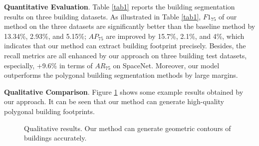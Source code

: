 \documentclass{article}
\begin{document}
\noindent \textbf{Quantitative Evaluation}.
Table \ref{tab1} reports the building segmentation results on three building datasets. As illustrated in Table \ref{tab1}, $F1_{75}$ of our method on the three datasets are significantly better than the baseline method by 13.34\%, 2.93\%, and 5.15\%; $AP_{75}$ are improved by 15.7\%, 2.1\%, and 4\%, which indicates that our method can extract building footprint precisely. Besides, the recall metrics are all enhanced by our approach on three building test datasets, especially, +9.6\% in terms of $AR_{75}$ on SpaceNet. Moreover, our model outperforms the polygonal building segmentation methods by large margins. 

\noindent \textbf{Qualitative Comparison}.
Figure \ref{Fig3} shows some example results obtained by our approach. It can be seen that our method can generate high-quality polygonal building footprints.
\begin{figure}[htbp]

	\vspace{-2mm}
	\setcounter{subfigure}{0}

	\caption{Qualitative results. Our method can generate geometric contours of buildings accurately.}
	\label{Fig3}
\end{figure}
\end{document}
